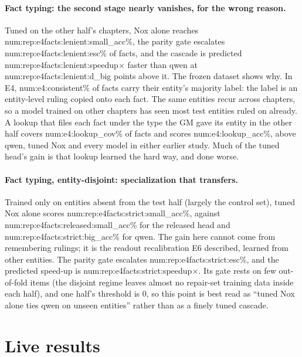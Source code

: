 \documentclass[11pt]{article}
\newcommand{\N}[1]{\csname num:#1\endcsname}
\begin{document}
\paragraph{Fact typing: the second stage nearly vanishes, for the wrong reason.} Tuned on the other
half's chapters, Nox alone reaches \N{rep:e4facts:lenient:small_acc}\%, the parity gate escalates
\N{rep:e4facts:lenient:esc}\% of facts, and the cascade is predicted
\N{rep:e4facts:lenient:speedup}$\times$ faster than qwen at \N{rep:e4facts:lenient:d_big} points
above it. The frozen dataset shows why. In E4, \N{e4:consistent}\% of facts carry their entity's
majority label: the label is an entity-level ruling copied onto each fact. The same entities recur
across chapters, so a model trained on other chapters has seen most test entities ruled on already.
A lookup that files each fact under the type the GM gave its entity in the other half covers
\N{e4:lookup_cov}\% of facts and scores \N{e4:lookup_acc}\%, above qwen, tuned Nox and every model in
either earlier study. Much of the tuned head's gain is that lookup learned the hard way, and done
worse.

\paragraph{Fact typing, entity-disjoint: specialization that transfers.} Trained only on entities
absent from the test half (largely the control set), tuned Nox alone scores
\N{rep:e4facts:strict:small_acc}\%, against \N{rep:e4facts:released:small_acc}\% for the released
head and \N{rep:e4facts:strict:big_acc}\% for qwen. The gain here cannot come from remembering
rulings; it is the readout recalibration E6 described, learned from other entities. The parity gate
escalates \N{rep:e4facts:strict:esc}\%, and the predicted speed-up is
\N{rep:e4facts:strict:speedup}$\times$. Its gate rests on few out-of-fold items (the disjoint
regime leaves almost no repair-set training data inside each half), and one half's threshold is 0,
so this point is best read as ``tuned Nox alone ties qwen on unseen entities'' rather than as a
finely tuned cascade.

\section{Live results}

\begin{table}[t]
\centering
\small
\setlength{\tabcolsep}{4pt}
\resizebox{\textwidth}{!}{}
\caption{Live Nox $\rightarrow$ qwen cascade on the real system (\N{live:e3:n} triage tokens,
\N{live:e4facts:n} facts, \N{live:e3:errors} errors). Tuned rows: this study, both halves pooled,
each half served with its own head and gate. $^\dagger$Released rows: the cascade study's live run of
the same system with the released head~\cite{cascade}. qwen accuracy and speed-ups are against qwen
alone measured in the same session. Throughput gain is items per second with 8 concurrent clients,
cascade over qwen alone.}
\label{tab:live}
\end{table}
\end{document}
